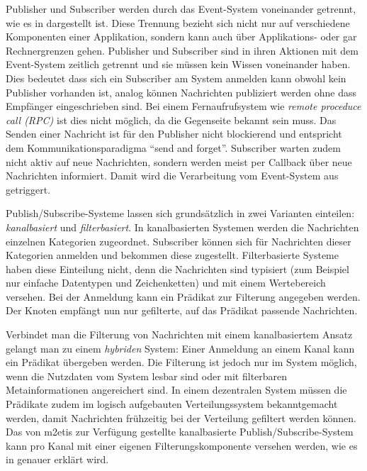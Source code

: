 Publisher und Subscriber werden durch das Event-System voneinander getrennt, wie es in  dargestellt ist. Diese Trennung bezieht sich nicht nur auf verschiedene Komponenten einer Applikation, sondern kann auch über Applikations- oder gar Rechnergrenzen gehen. Publisher und Subscriber sind in ihren Aktionen mit dem Event-System zeitlich getrennt und sie müssen kein Wissen voneinander haben. Dies bedeutet dass sich ein Subscriber am System anmelden kann obwohl kein Publisher vorhanden ist, analog können Nachrichten publiziert werden ohne dass Empfänger eingeschrieben sind. Bei einem Fernaufrufsystem wie \emph{remote proceduce call (RPC)} \cite{Birrell1984Implementing} ist dies nicht möglich, da die Gegenseite bekannt sein muss. Das Senden einer Nachricht ist für den Publisher nicht blockierend und entspricht dem Kommunikationsparadigma ``send and forget''. Subscriber warten zudem nicht aktiv auf neue Nachrichten, sondern werden meist per Callback über neue Nachrichten informiert. Damit wird die Verarbeitung vom Event-System aus getriggert. 

Publish/Subscribe-Systeme lassen sich grundsätzlich in zwei Varianten einteilen: \emph{kanalbasiert} und \emph{filterbasiert}. In kanalbasierten Systemen werden die Nachrichten einzelnen Kategorien zugeordnet. Subscriber können sich für Nachrichten dieser Kategorien anmelden und bekommen diese zugestellt. Filterbasierte Systeme haben diese Einteilung nicht, denn die Nachrichten sind typisiert (zum Beispiel nur einfache Datentypen und Zeichenketten) und mit einem Wertebereich versehen. Bei der Anmeldung kann ein Prädikat zur Filterung angegeben werden. Der Knoten empfängt nun nur gefilterte, auf das Prädikat passende Nachrichten.

Verbindet man die Filterung von Nachrichten mit einem kanalbasiertem Ansatz gelangt man zu einem \emph{hybriden} System: Einer Anmeldung an einem Kanal kann ein Prädikat übergeben werden. Die Filterung ist jedoch nur im System möglich, wenn die Nutzdaten vom System lesbar sind oder mit filterbaren Metainformationen angereichert sind. In einem dezentralen System müssen die Prädikate zudem im logisch aufgebauten Verteilungssystem bekanntgemacht werden, damit Nachrichten frühzeitig bei der Verteilung gefiltert werden können. Das von \ac{m2etis} zur Verfügung gestellte kanalbasierte Publish/Subscribe-System kann pro Kanal mit einer eigenen Filterungskomponente versehen werden, wie es in  genauer erklärt wird.

